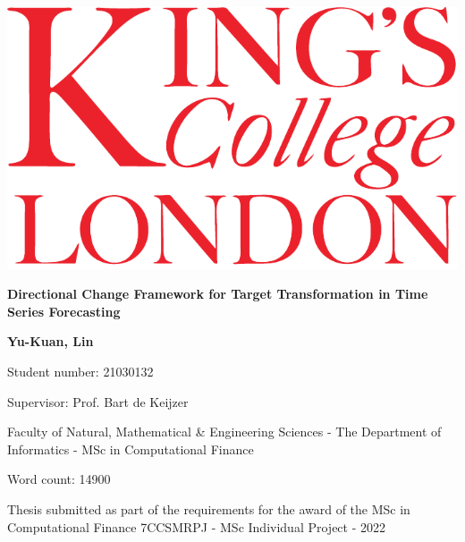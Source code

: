 \begin{titlepage}
    \begin{center}

        \includegraphics{./references/images/kcl-eps-converted-to.pdf}
        
        \vspace*{1cm}

        {\Huge \textbf{Directional Change Framework for Target Transformation in Time Series Forecasting}} \\
        
        \vspace*{1cm}

        \textbf{Yu-Kuan, Lin}
        
        Student number: 21030132
        
        Supervisor: Prof. Bart de Keijzer
        
        Faculty of Natural, Mathematical \& Engineering Sciences - The Department of Informatics - MSc in Computational Finance
        
        \vfill
        
        Word count: 14900
        
        Thesis submitted as part of the requirements for the award of the MSc in Computational Finance 7CCSMRPJ - MSc Individual Project - 2022
        
    \end{center}
\end{titlepage}
